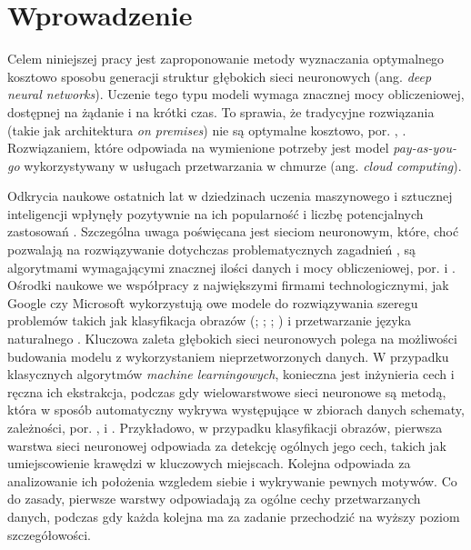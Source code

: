 \documentclass[12pt,a4paper,twoside]{article}
\begin{document}
\clearpage
\thispagestyle{empty}
\mbox{}

\clearpage

\tableofcontents

\clearpage

\section{Wprowadzenie}
\noindent
Celem niniejszej pracy jest zaproponowanie metody wyznaczania optymalnego kosztowo sposobu generacji struktur głębokich sieci neuronowych (ang. \textit{deep neural networks}). Uczenie tego typu modeli wymaga znacznej mocy obliczeniowej, dostępnej na żądanie i na krótki czas. To sprawia, że tradycyjne rozwiązania (takie jak architektura \textit{on premises}) nie są optymalne kosztowo, por. \citet{armburst2010}, \citet{oecd2014}. Rozwiązaniem, które odpowiada na wymienione potrzeby jest model \textit{pay-as-you-go} wykorzystywany w usługach przetwarzania w chmurze (ang. \textit{cloud computing}).

Odkrycia naukowe ostatnich lat w dziedzinach uczenia maszynowego i sztucznej inteligencji wpłynęły pozytywnie na ich popularność i liczbę potencjalnych zastosowań \citep{lecun2015}. Szczególna uwaga poświęcana jest sieciom neuronowym, które, choć pozwalają na rozwiązywanie dotychczas problematycznych zagadnień \citep{lecun2015}, są algorytmami wymagającymi znacznej ilości danych i mocy obliczeniowej, por. \citet{krizhevsky2012} i \citet{srivastava2014}. Ośrodki naukowe we współpracy z największymi firmami technologicznymi, jak Google czy Microsoft wykorzystują owe modele \citep{goodfellow2016} do rozwiązywania szeregu problemów takich jak klasyfikacja obrazów (\citet{krizhevsky2012}; \citet{shetty2016}; \citet{szegedy2014}; \citet{chen2016}) i przetwarzanie języka naturalnego \citep{hinton2012}. Kluczowa zaleta głębokich sieci neuronowych polega na możliwości budowania modelu z wykorzystaniem nieprzetworzonych danych. W przypadku klasycznych algorytmów \textit{machine learningowych}, konieczna jest inżynieria cech i ręczna ich ekstrakcja, podczas gdy wielowarstwowe sieci neuronowe są metodą, która w sposób automatyczny wykrywa występujące w zbiorach danych schematy, zależności, por. \citet{girschick2014}, \citet{gysel2016} i \citet{mnih2013}. Przykładowo, w przypadku klasyfikacji obrazów, pierwsza warstwa sieci neuronowej odpowiada za detekcję ogólnych jego cech, takich jak umiejscowienie krawędzi w kluczowych miejscach. Kolejna odpowiada za analizowanie ich położenia wzgledem siebie i wykrywanie pewnych motywów. Co do zasady, pierwsze warstwy odpowiadają za ogólne cechy przetwarzanych danych, podczas gdy każda kolejna ma za zadanie przechodzić na wyższy poziom szczegółowości.
\end{document}
